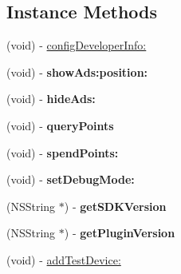 \subsection*{Instance Methods}
\begin{DoxyCompactItemize}
\item 
(void) -\/ \hyperlink{interfaceAdsAdmob_a636eafaed5d30852f70d47247231293e}{config\+Developer\+Info\+:}
\item 
\mbox{\label{interfaceAdsAdmob_adae59e70713abd2f0257bdd5e2c12aa8}} 
(void) -\/ {\bfseries show\+Ads\+:position\+:}
\item 
\mbox{\label{interfaceAdsAdmob_a34615efe1fd2ca9893bd442dfa894bd7}} 
(void) -\/ {\bfseries hide\+Ads\+:}
\item 
\mbox{\label{interfaceAdsAdmob_a611c964c5100b085efd32c116b349de9}} 
(void) -\/ {\bfseries query\+Points}
\item 
\mbox{\label{interfaceAdsAdmob_a15575b93ca164a69801498a9c6638ab3}} 
(void) -\/ {\bfseries spend\+Points\+:}
\item 
\mbox{\label{interfaceAdsAdmob_a2b5929e4605d3dae5b00e4f07a1fed88}} 
(void) -\/ {\bfseries set\+Debug\+Mode\+:}
\item 
\mbox{\label{interfaceAdsAdmob_a935b705cc00cc6e7b232286cbe67c8a1}} 
(N\+S\+String $\ast$) -\/ {\bfseries get\+S\+D\+K\+Version}
\item 
\mbox{\label{interfaceAdsAdmob_a2fec2057157228235c2ef8190f82efbd}} 
(N\+S\+String $\ast$) -\/ {\bfseries get\+Plugin\+Version}
\item 
(void) -\/ \hyperlink{interfaceAdsAdmob_a631fa04a8406d457cbbdaf31bde7d895}{add\+Test\+Device\+:}
\end{DoxyCompactItemize}

